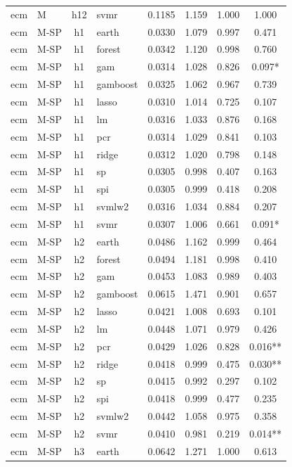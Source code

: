 \begin{ThreePartTable}
\begin{longtable}[t]{llclcccc}
ecm & M & h12 & svmr & 0.1185 & 1.159 & 1.000 & 1.000\\
\addlinespace
ecm & M-SP & h1 & earth & 0.0330 & 1.079 & 0.997 & 0.471\\
ecm & M-SP & h1 & forest & 0.0342 & 1.120 & 0.998 & 0.760\\
ecm & M-SP & h1 & gam & 0.0314 & 1.028 & 0.826 & 0.097*\\
ecm & M-SP & h1 & gamboost & 0.0325 & 1.062 & 0.967 & 0.739\\
ecm & M-SP & h1 & lasso & 0.0310 & 1.014 & 0.725 & 0.107\\
ecm & M-SP & h1 & lm & 0.0316 & 1.033 & 0.876 & 0.168\\
ecm & M-SP & h1 & pcr & 0.0314 & 1.029 & 0.841 & 0.103\\
ecm & M-SP & h1 & ridge & 0.0312 & 1.020 & 0.798 & 0.148\\
ecm & M-SP & h1 & sp & 0.0305 & 0.998 & 0.407 & 0.163\\
ecm & M-SP & h1 & spi & 0.0305 & 0.999 & 0.418 & 0.208\\
ecm & M-SP & h1 & svmlw2 & 0.0316 & 1.034 & 0.884 & 0.207\\
ecm & M-SP & h1 & svmr & 0.0307 & 1.006 & 0.661 & 0.091*\\
\addlinespace
ecm & M-SP & h2 & earth & 0.0486 & 1.162 & 0.999 & 0.464\\
ecm & M-SP & h2 & forest & 0.0494 & 1.181 & 0.998 & 0.410\\
ecm & M-SP & h2 & gam & 0.0453 & 1.083 & 0.989 & 0.403\\
ecm & M-SP & h2 & gamboost & 0.0615 & 1.471 & 0.901 & 0.657\\
ecm & M-SP & h2 & lasso & 0.0421 & 1.008 & 0.693 & 0.101\\
ecm & M-SP & h2 & lm & 0.0448 & 1.071 & 0.979 & 0.426\\
ecm & M-SP & h2 & pcr & 0.0429 & 1.026 & 0.828 & 0.016**\\
ecm & M-SP & h2 & ridge & 0.0418 & 0.999 & 0.475 & 0.030**\\
ecm & M-SP & h2 & sp & 0.0415 & 0.992 & 0.297 & 0.102\\
ecm & M-SP & h2 & spi & 0.0418 & 0.999 & 0.477 & 0.235\\
ecm & M-SP & h2 & svmlw2 & 0.0442 & 1.058 & 0.975 & 0.358\\
ecm & M-SP & h2 & svmr & 0.0410 & 0.981 & 0.219 & 0.014**\\
\addlinespace
ecm & M-SP & h3 & earth & 0.0642 & 1.271 & 1.000 & 0.613\\

\end{longtable}
\end{ThreePartTable}
